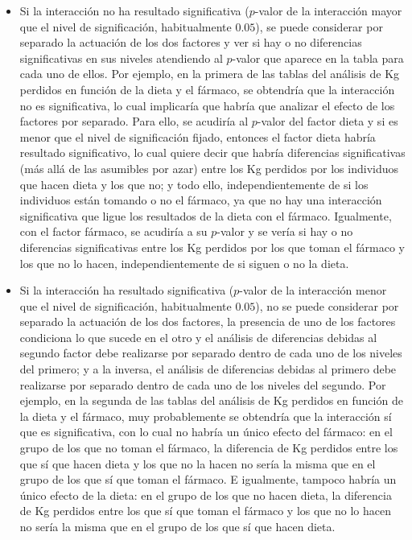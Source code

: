 \documentclass[
  spanish,
  a4paper,
]{scrreport}
\theoremstyle{plain}
\theoremstyle{definition}
\theoremstyle{definition}
\theoremstyle{remark}
\begin{document}
\begin{itemize}
\item
  Si la interacción no ha resultado significativa (\(p\)-valor de la
  interacción mayor que el nivel de significación, habitualmente
  \(0.05\)), se puede considerar por separado la actuación de los dos
  factores y ver si hay o no diferencias significativas en sus niveles
  atendiendo al \(p\)-valor que aparece en la tabla para cada uno de
  ellos. Por ejemplo, en la primera de las tablas del análisis de Kg
  perdidos en función de la dieta y el fármaco, se obtendría que la
  interacción no es significativa, lo cual implicaría que habría que
  analizar el efecto de los factores por separado. Para ello, se
  acudiría al \(p\)-valor del factor dieta y si es menor que el nivel de
  significación fijado, entonces el factor dieta habría resultado
  significativo, lo cual quiere decir que habría diferencias
  significativas (más allá de las asumibles por azar) entre los Kg
  perdidos por los individuos que hacen dieta y los que no; y todo ello,
  independientemente de si los individuos están tomando o no el fármaco,
  ya que no hay una interacción significativa que ligue los resultados
  de la dieta con el fármaco. Igualmente, con el factor fármaco, se
  acudiría a su \(p\)-valor y se vería si hay o no diferencias
  significativas entre los Kg perdidos por los que toman el fármaco y
  los que no lo hacen, independientemente de si siguen o no la dieta.
\item
  Si la interacción ha resultado significativa (\(p\)-valor de la
  interacción menor que el nivel de significación, habitualmente
  \(0.05\)), no se puede considerar por separado la actuación de los dos
  factores, la presencia de uno de los factores condiciona lo que sucede
  en el otro y el análisis de diferencias debidas al segundo factor debe
  realizarse por separado dentro de cada uno de los niveles del primero;
  y a la inversa, el análisis de diferencias debidas al primero debe
  realizarse por separado dentro de cada uno de los niveles del segundo.
  Por ejemplo, en la segunda de las tablas del análisis de Kg perdidos
  en función de la dieta y el fármaco, muy probablemente se obtendría
  que la interacción sí que es significativa, con lo cual no habría un
  único efecto del fármaco: en el grupo de los que no toman el fármaco,
  la diferencia de Kg perdidos entre los que sí que hacen dieta y los
  que no la hacen no sería la misma que en el grupo de los que sí que
  toman el fármaco. E igualmente, tampoco habría un único efecto de la
  dieta: en el grupo de los que no hacen dieta, la diferencia de Kg
  perdidos entre los que sí que toman el fármaco y los que no lo hacen
  no sería la misma que en el grupo de los que sí que hacen dieta.
\end{itemize}
\end{document}
